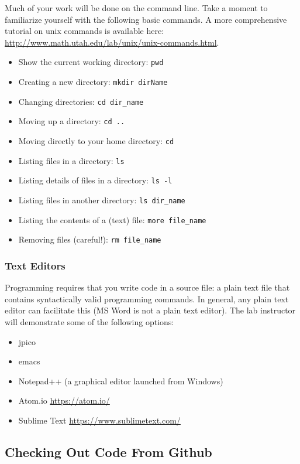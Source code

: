 \documentclass[12pt]{scrartcl}
\begin{document}
Much of your work will be done on the command line.  Take a moment to 
familiarize yourself with the following basic commands.  A more comprehensive 
tutorial on unix commands is available here: \url{http://www.math.utah.edu/lab/unix/unix-commands.html}.
\begin{itemize}
  \item Show the current working directory: \texttt{pwd}
  \item Creating a new directory: \texttt{mkdir dirName}
  \item Changing directories: \texttt{cd dir_name}
  \item Moving up a directory: \texttt{cd ..}
  \item Moving directly to your home directory: \texttt{cd ~}
  \item Listing files in a directory: \texttt{ls}
  \item Listing details of files in a directory: \texttt{ls -l}
  \item Listing files in another directory: \texttt{ls dir_name}
  \item Listing the contents of a (text) file: \texttt{more file_name}
  \item Removing files (careful!):  \texttt{rm file_name}
\end{itemize}

\subsubsection*{Text Editors}

Programming requires that you write code in a source file: a plain text file that 
contains syntactically valid programming commands.  In general, any plain 
text editor can facilitate this (MS Word is not a plain text editor).  The lab 
instructor will demonstrate some of the following options: 
\begin{itemize}
  \item jpico
  \item emacs
  \item Notepad++ (a graphical editor launched from Windows)
  \item Atom.io \url{https://atom.io/}
  \item Sublime Text \url{https://www.sublimetext.com/}
\end{itemize}

\subsection{Checking Out Code From Github}
\end{document}
